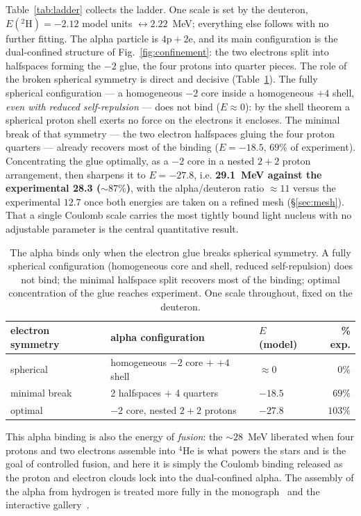 \documentclass[11pt]{article}
\begin{document}
Table~\ref{tab:ladder} collects the ladder. One scale is set by the deuteron,
$E(^2\mathrm{H})=-2.12$ model units $\leftrightarrow 2.22$~MeV; everything else follows with no
further fitting. The alpha particle is $\mathrm{4p}+\mathrm{2e}$, and its main configuration is
the dual-confined structure of Fig.~\ref{fig:confinement}: the two electrons split into halfspaces
forming the $-2$ glue, the four protons into quarter pieces. The role of the broken spherical
symmetry is direct and decisive (Table~\ref{tab:symmetry}). The fully spherical configuration ---
a homogeneous $-2$ core inside a homogeneous $+4$ shell, \emph{even with reduced self-repulsion}
--- does not bind ($E\approx 0$): by the shell theorem a spherical proton shell exerts no force on
the electrons it encloses. The minimal break of that symmetry --- the two electron halfspaces
gluing the four proton quarters --- already recovers most of the binding ($E=-18.5$, $69\%$ of
experiment). Concentrating the glue optimally, as a $-2$ core in a nested $2{+}2$ proton
arrangement, then sharpens it to $E=-27.8$, i.e. \textbf{29.1~MeV against the experimental 28.3
(${\sim}87\%$)}, with the alpha/deuteron ratio ${\approx}11$ versus the experimental $12.7$
once both energies are taken on a refined mesh (\S\ref{sec:mesh}). That a single
Coulomb scale carries the most tightly bound light nucleus with no adjustable parameter is the
central quantitative result.

\begin{table}[t]
\centering
\begin{tabular}{lllr}
\toprule
electron symmetry & alpha configuration & $E$ (model) & \% exp.\\
\midrule
spherical & homogeneous $-2$ core $+$ $+4$ shell & $\approx 0$ & $0\%$\\
minimal break & 2 halfspaces $+$ 4 quarters & $-18.5$ & $69\%$\\
optimal & $-2$ core, nested $2{+}2$ protons & $-27.8$ & $103\%$\\
\bottomrule
\end{tabular}
\caption{The alpha binds only when the electron glue breaks spherical symmetry. A fully spherical
configuration (homogeneous core and shell, reduced self-repulsion) does not bind; the minimal
halfspace split recovers most of the binding; optimal concentration of the glue reaches
experiment. One scale throughout, fixed on the deuteron.}
\label{tab:symmetry}
\end{table}

This alpha binding is also the energy of \emph{fusion}: the ${\sim}28$~MeV liberated when four
protons and two electrons assemble into $^4$He is what powers the stars and is the goal of
controlled fusion, and here it is simply the Coulomb binding released as the proton and electron
clouds lock into the dual-confined alpha. The assembly of the alpha from hydrogen is treated more
fully in the monograph~\cite{Johnson-Book} and the interactive gallery~\cite{Gallery}.
\end{document}

